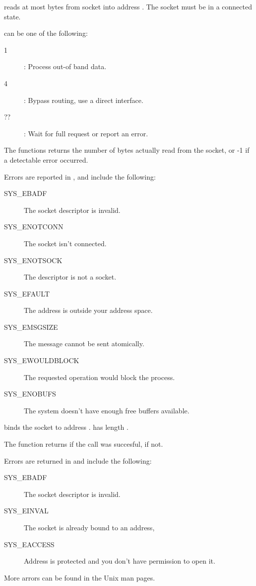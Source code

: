 { reads at most  bytes from socket  into
address . The socket must be in a connected state.

 can be one of the following:
\begin{description}
\item [1] : Process out-of band data.
\item [4] : Bypass routing, use a direct interface.
\item [??] : Wait for full request or report an error.
\end{description}

The functions returns the number of bytes actually read from the socket, or
-1 if a detectable error occurred.}
{Errors are reported in , and include the following:
\begin{description}
\item[SYS\_EBADF] The socket descriptor is invalid.
\item[SYS\_ENOTCONN] The socket isn't connected.
\item[SYS\_ENOTSOCK] The descriptor is not a socket.
\item[SYS\_EFAULT] The address is outside your address space.
\item[SYS\_EMSGSIZE] The message cannot be sent atomically.
\item[SYS\_EWOULDBLOCK] The requested operation would block the process.
\item[SYS\_ENOBUFS] The system doesn't have enough free buffers available.
\end{description}
}{}

{ binds the socket  to address . 
has length .

The function returns  if the call was succesful,  if
not.
}
{Errors are returned in  and include the following:
\begin{description}
\item[SYS\_EBADF] The socket descriptor is invalid.
\item[SYS\_EINVAL] The socket is already bound to an address,
\item[SYS\_EACCESS] Address is protected and you don't have permission to
open it.
\end{description}
More arrors can be found in the Unix man pages.
}{}

